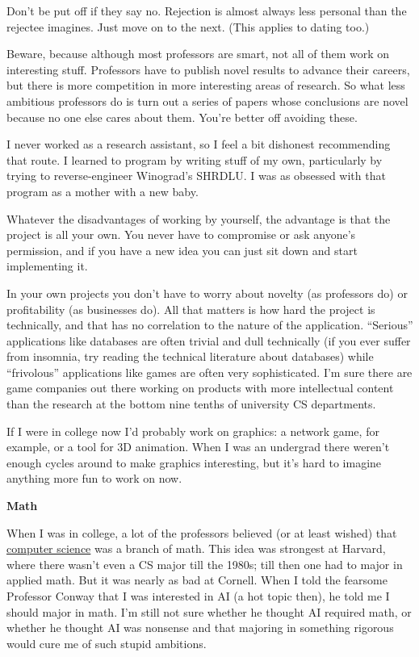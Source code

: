 Don't be put off if they say no. Rejection is almost always less
personal than the rejectee imagines. Just move on to the next. (This
applies to dating too.)

Beware, because although most professors are smart, not all of them work
on interesting stuff. Professors have to publish novel results to
advance their careers, but there is more competition in more interesting
areas of research. So what less ambitious professors do is turn out a
series of papers whose conclusions are novel because no one else cares
about them. You're better off avoiding these.

I never worked as a research assistant, so I feel a bit dishonest
recommending that route. I learned to program by writing stuff of my
own, particularly by trying to reverse-engineer Winograd's SHRDLU. I was
as obsessed with that program as a mother with a new baby.

Whatever the disadvantages of working by yourself, the advantage is that
the project is all your own. You never have to compromise or ask
anyone's permission, and if you have a new idea you can just sit down
and start implementing it.

In your own projects you don't have to worry about novelty (as
professors do) or profitability (as businesses do). All that matters is
how hard the project is technically, and that has no correlation to the
nature of the application. ``Serious'' applications like databases are
often trivial and dull technically (if you ever suffer from insomnia,
try reading the technical literature about databases) while
``frivolous'' applications like games are often very sophisticated. I'm
sure there are game companies out there working on products with more
intellectual content than the research at the bottom nine tenths of
university CS departments.

If I were in college now I'd probably work on graphics: a network game,
for example, or a tool for 3D animation. When I was an undergrad there
weren't enough cycles around to make graphics interesting, but it's hard
to imagine anything more fun to work on now.

\textbf{Math}

When I was in college, a lot of the professors believed (or at least
wished) that \href{hp.html}{computer science} was a branch of math. This
idea was strongest at Harvard, where there wasn't even a CS major till
the 1980s; till then one had to major in applied math. But it was nearly
as bad at Cornell. When I told the fearsome Professor Conway that I was
interested in AI (a hot topic then), he told me I should major in math.
I'm still not sure whether he thought AI required math, or whether he
thought AI was nonsense and that majoring in something rigorous would
cure me of such stupid ambitions.

